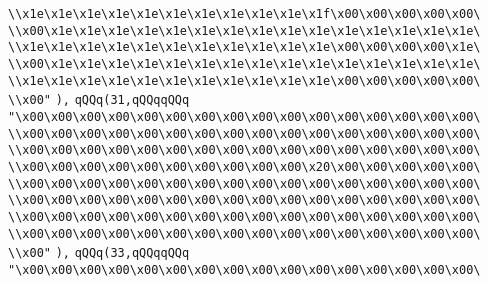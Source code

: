 \verb|\\x1e\x1e\x1e\x1e\x1e\x1e\x1e\x1e\x1e\x1e\x1f\x00\x00\x00\x00\x00\|\newline
\verb|\\x00\x1e\x1e\x1e\x1e\x1e\x1e\x1e\x1e\x1e\x1e\x1e\x1e\x1e\x1e\x1e\|\newline
\verb|\\x1e\x1e\x1e\x1e\x1e\x1e\x1e\x1e\x1e\x1e\x1e\x00\x00\x00\x00\x1e\|\newline
\verb|\\x00\x1e\x1e\x1e\x1e\x1e\x1e\x1e\x1e\x1e\x1e\x1e\x1e\x1e\x1e\x1e\|\newline
\verb|\\x1e\x1e\x1e\x1e\x1e\x1e\x1e\x1e\x1e\x1e\x1e\x00\x00\x00\x00\x00\|\newline
\verb|\\x00"|\newline
\verb|),|\newline
\verb|qQQq(31,qQQqqQQq|\newline
\verb|"\x00\x00\x00\x00\x00\x00\x00\x00\x00\x00\x00\x00\x00\x00\x00\x00\|\newline
\verb|\\x00\x00\x00\x00\x00\x00\x00\x00\x00\x00\x00\x00\x00\x00\x00\x00\|\newline
\verb|\\x00\x00\x00\x00\x00\x00\x00\x00\x00\x00\x00\x00\x00\x00\x00\x00\|\newline
\verb|\\x00\x00\x00\x00\x00\x00\x00\x00\x00\x00\x20\x00\x00\x00\x00\x00\|\newline
\verb|\\x00\x00\x00\x00\x00\x00\x00\x00\x00\x00\x00\x00\x00\x00\x00\x00\|\newline
\verb|\\x00\x00\x00\x00\x00\x00\x00\x00\x00\x00\x00\x00\x00\x00\x00\x00\|\newline
\verb|\\x00\x00\x00\x00\x00\x00\x00\x00\x00\x00\x00\x00\x00\x00\x00\x00\|\newline
\verb|\\x00\x00\x00\x00\x00\x00\x00\x00\x00\x00\x00\x00\x00\x00\x00\x00\|\newline
\verb|\\x00"|\newline
\verb|),|\newline
\verb|qQQq(33,qQQqqQQq|\newline
\verb|"\x00\x00\x00\x00\x00\x00\x00\x00\x00\x00\x00\x00\x00\x00\x00\x00\|\newline
